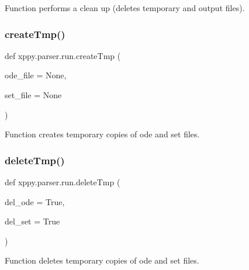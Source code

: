\begin{DoxyVerb}Function performs a clean up (deletes temporary and output files).
\end{DoxyVerb}
 \mbox{\label{namespacexppy_1_1parser_1_1run_aa346685c25b7fcb37a1bd65b5dc96d32}} 
\subsubsection{\texorpdfstring{create\+Tmp()}{createTmp()}}
{\footnotesize\ttfamily def xppy.\+parser.\+run.\+create\+Tmp (\begin{DoxyParamCaption}\item[{}]{ode\+\_\+file = {\ttfamily None},  }\item[{}]{set\+\_\+file = {\ttfamily None} }\end{DoxyParamCaption})}

\begin{DoxyVerb}Function creates temporary copies of ode and set files.
\end{DoxyVerb}
 \mbox{\label{namespacexppy_1_1parser_1_1run_ad400655fd25cbcf3e8baba3d7442af44}} 
\subsubsection{\texorpdfstring{delete\+Tmp()}{deleteTmp()}}
{\footnotesize\ttfamily def xppy.\+parser.\+run.\+delete\+Tmp (\begin{DoxyParamCaption}\item[{}]{del\+\_\+ode = {\ttfamily True},  }\item[{}]{del\+\_\+set = {\ttfamily True} }\end{DoxyParamCaption})}

\begin{DoxyVerb}Function deletes temporary copies of ode and set files.
\end{DoxyVerb}
 \mbox{\label{namespacexppy_1_1parser_1_1run_a32f88ffa66a68d043cef8d93210c7786}} 
